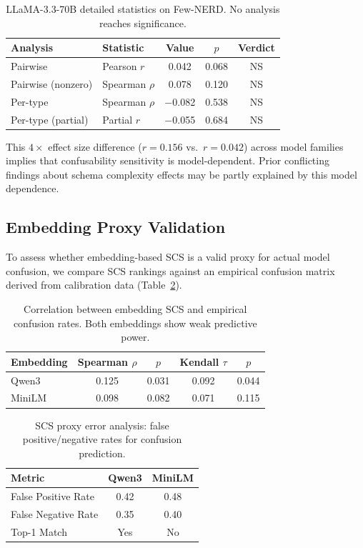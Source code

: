 \documentclass[11pt,a4paper]{article}
\begin{document}
\begin{table}[t]
\centering
\caption{LLaMA-3.3-70B detailed statistics on Few-NERD. No analysis reaches significance.}
\label{tab:llama_detail}
\small
\begin{tabular}{llccc}
\toprule
\textbf{Analysis} & \textbf{Statistic} & \textbf{Value} & \textbf{$p$} & \textbf{Verdict} \\
\midrule
Pairwise & Pearson $r$ & 0.042 & 0.068 & NS \\
Pairwise (nonzero) & Spearman $\rho$ & 0.078 & 0.120 & NS \\
Per-type & Spearman $\rho$ & $-$0.082 & 0.538 & NS \\
Per-type (partial) & Partial $r$ & $-$0.055 & 0.684 & NS \\
\bottomrule
\end{tabular}
\end{table}

This $4{\times}$ effect size difference ($r{=}0.156$ vs.\ $r{=}0.042$) across model families implies that confusability sensitivity is model-dependent.
Prior conflicting findings about schema complexity effects may be partly explained by this model dependence.

\subsection{Embedding Proxy Validation}
\label{sec:scs_validation}

To assess whether embedding-based SCS is a valid proxy for actual model confusion, we compare SCS rankings against an empirical confusion matrix derived from calibration data (Table~\ref{tab:scs_validation}).

\begin{table}[t]
\centering
\caption{Correlation between embedding SCS and empirical confusion rates. Both embeddings show weak predictive power.}
\label{tab:scs_validation}
\small
\begin{tabular}{lcccc}
\toprule
\textbf{Embedding} & \textbf{Spearman $\rho$} & \textbf{$p$} & \textbf{Kendall $\tau$} & \textbf{$p$} \\
\midrule
Qwen3 & 0.125 & 0.031 & 0.092 & 0.044 \\
MiniLM & 0.098 & 0.082 & 0.071 & 0.115 \\
\bottomrule
\end{tabular}
\end{table}

\begin{table}[t]
\centering
\caption{SCS proxy error analysis: false positive/negative rates for confusion prediction.}
\label{tab:scs_errors}
\small
\begin{tabular}{lcc}
\toprule
\textbf{Metric} & \textbf{Qwen3} & \textbf{MiniLM} \\
\midrule
False Positive Rate & 0.42 & 0.48 \\
False Negative Rate & 0.35 & 0.40 \\
Top-1 Match & Yes & No \\
\bottomrule
\end{tabular}
\end{table}
\end{document}
